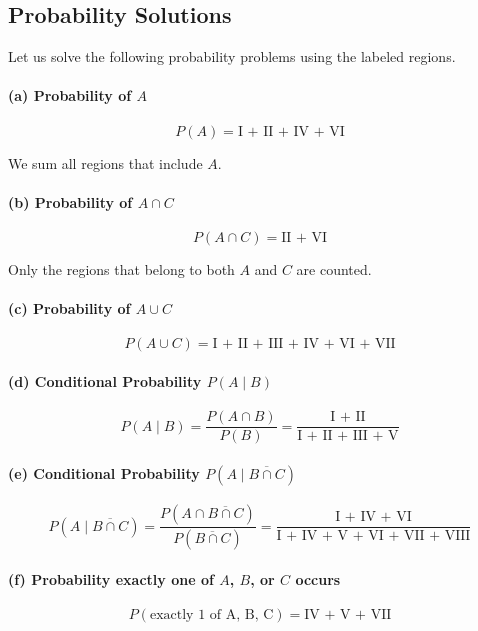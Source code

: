 \subsection{Probability Solutions}
\begin{eg}
Let us solve the following probability problems using the labeled regions.

\paragraph{(a) Probability of $A$}
\[
P(A) = \text{I + II + IV + VI}
\]
\begin{explanation}
We sum all regions that include $A$.
\end{explanation}

\paragraph{(b) Probability of $A \cap C$}
\[
P(A \cap C) = \text{II + VI}
\]
\begin{explanation}
Only the regions that belong to both $A$ and $C$ are counted.
\end{explanation}

\paragraph{(c) Probability of $A \cup C$}
\[
P(A \cup C) = \text{I + II + III + IV + VI + VII}
\]

\paragraph{(d) Conditional Probability $P(A \mid B)$}
\[
P(A \mid B) = \frac{P(A \cap B)}{P(B)} = \frac{\text{I + II}}{\text{I + II + III + V}}
\]

\paragraph{(e) Conditional Probability $P(A \mid \overline{B \cap C})$}
\[
P(A \mid \overline{B \cap C}) = \frac{P(A \cap \overline{B \cap C})}{P(\overline{B \cap C})} = \frac{\text{I + IV + VI}}{\text{I + IV + V + VI + VII + VIII}}
\]

\paragraph{(f) Probability exactly one of $A$, $B$, or $C$ occurs}
\[
P(\text{exactly 1 of A, B, C}) = \text{IV + V + VII}
\]


\end{eg}
